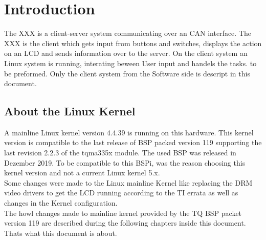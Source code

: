 \chapter{Introduction} \label{chp:einleitung}

The XXX is a client-server system communicating over an CAN interface. The XXX
is the client which gets input from buttons and switches, displays the action
on an LCD and sends information over to the server. On the client system an
Linux system is running, interating beween User input and handels the tasks.
to be preformed. Only the client system from the Software side is descript in
this document.

\section{About the Linux Kernel}%
\label{sec:About the Linux Kernel}

A mainline Linux kernel version 4.4.39 is running on this hardware. This kernel
version is compatible to the last release of BSP packed version 119 supporting
the last revision 2.2.3 of the tqma335x module. The used \ac{BSP} was released
in Dezember 2019. To be compatible to this BSPi, was the reason choosing this
kernel version and not a current Linux kernel 5.x.
\\
Some changes were made to the Linux mainline Kernel like replacing the DRM video
drivers to get the LCD running according to the TI errata
\cite{TI_am335x_errata} as well as changes in the Kernel configuration.
\\
The howl changes made to mainline kernel provided by the TQ BSP packet version
119 \cite{tq_bsp119} are described during the following chapters inside this
document. Thats what this document is about.
